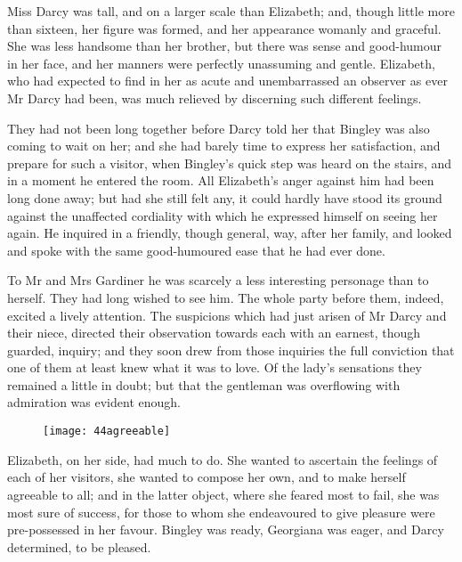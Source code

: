 Miss Darcy was tall, and on a larger scale than Elizabeth; and, though little more than sixteen, her figure was formed, and her appearance womanly and graceful. She was less handsome than her brother, but there was sense and good-humour in her face, and her manners were perfectly unassuming and gentle. Elizabeth, who had expected to find in her as acute and unembarrassed an observer as ever Mr Darcy had been, was much relieved by discerning such different feelings.

They had not been long together before Darcy told her that Bingley was also coming to wait on her; and she had barely time to express her satisfaction, and prepare for such a visitor, when Bingley's quick step was heard on the stairs, and in a moment he entered the room. All Elizabeth's anger against him had been long done away; but had she still felt any, it could hardly have stood its ground against the unaffected cordiality with which he expressed himself on seeing her again. He inquired in a friendly, though general, way, after her family, and looked and spoke with the same good-humoured ease that he had ever done.

To Mr and Mrs Gardiner he was scarcely a less interesting personage than to herself. They had long wished to see him. The whole party before them, indeed, excited a lively attention. The suspicions which had just arisen of Mr Darcy and their niece, directed their observation towards each with an earnest, though guarded, inquiry; and they soon drew from those inquiries the full conviction that one of them at least knew what it was to love. Of the lady's sensations they remained a little in doubt; but that the gentleman was overflowing with admiration was evident enough.

\begin{figure}[tbh]
\centering
\texttt{[image: 44agreeable]}
\end{figure}

Elizabeth, on her side, had much to do. She wanted to ascertain the feelings of each of her visitors, she wanted to compose her own, and to make herself agreeable to all; and in the latter object, where she feared most to fail, she was most sure of success, for those to whom she endeavoured to give pleasure were pre-possessed in her favour. Bingley was ready, Georgiana was eager, and Darcy determined, to be pleased.

